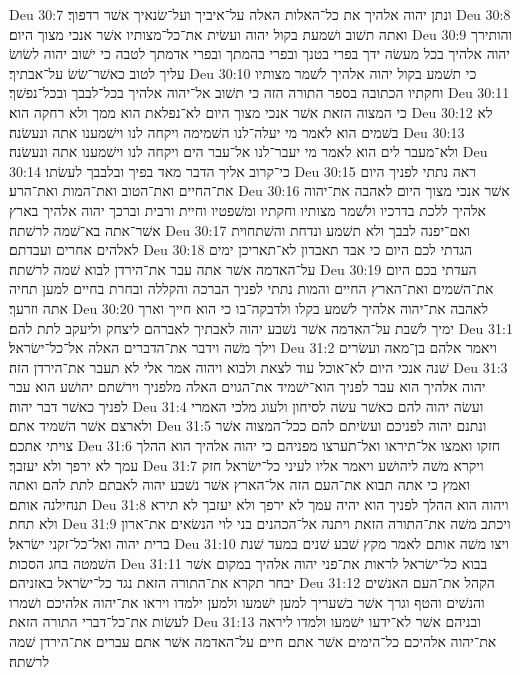 Deu 30:7  ונתן יהוה אלהיך את כל־האלות האלה על־איביך ועל־שׂנאיך אשׁר רדפוך׃
Deu 30:8  ואתה תשׁוב ושׁמעת בקול יהוה ועשׂית את־כל־מצותיו אשׁר אנכי מצוך היום׃
Deu 30:9  והותירך יהוה אלהיך בכל מעשׂה ידך בפרי בטנך ובפרי בהמתך ובפרי אדמתך לטבה כי ישׁוב יהוה לשׂושׂ עליך לטוב כאשׁר־שׂשׂ על־אבתיך׃
Deu 30:10  כי תשׁמע בקול יהוה אלהיך לשׁמר מצותיו וחקתיו הכתובה בספר התורה הזה כי תשׁוב אל־יהוה אלהיך בכל־לבבך ובכל־נפשׁך׃
Deu 30:11  כי המצוה הזאת אשׁר אנכי מצוך היום לא־נפלאת הוא ממך ולא רחקה הוא׃
Deu 30:12  לא בשׁמים הוא לאמר מי יעלה־לנו השׁמימה ויקחה לנו וישׁמענו אתה ונעשׂנה׃
Deu 30:13  ולא־מעבר לים הוא לאמר מי יעבר־לנו אל־עבר הים ויקחה לנו וישׁמענו אתה ונעשׂנה׃
Deu 30:14  כי־קרוב אליך הדבר מאד בפיך ובלבבך לעשׂתו׃
Deu 30:15  ראה נתתי לפניך היום את־החיים ואת־הטוב ואת־המות ואת־הרע׃
Deu 30:16  אשׁר אנכי מצוך היום לאהבה את־יהוה אלהיך ללכת בדרכיו ולשׁמר מצותיו וחקתיו ומשׁפטיו וחיית ורבית וברכך יהוה אלהיך בארץ אשׁר־אתה בא־שׁמה לרשׁתה׃
Deu 30:17  ואם־יפנה לבבך ולא תשׁמע ונדחת והשׁתחוית לאלהים אחרים ועבדתם׃
Deu 30:18  הגדתי לכם היום כי אבד תאבדון לא־תאריכן ימים על־האדמה אשׁר אתה עבר את־הירדן לבוא שׁמה לרשׁתה׃
Deu 30:19  העדתי בכם היום את־השׁמים ואת־הארץ החיים והמות נתתי לפניך הברכה והקללה ובחרת בחיים למען תחיה אתה וזרעך׃
Deu 30:20  לאהבה את־יהוה אלהיך לשׁמע בקלו ולדבקה־בו כי הוא חייך וארך ימיך לשׁבת על־האדמה אשׁר נשׁבע יהוה לאבתיך לאברהם ליצחק וליעקב לתת להם׃
Deu 31:1  וילך משׁה וידבר את־הדברים האלה אל־כל־ישׂראל׃
Deu 31:2  ויאמר אלהם בן־מאה ועשׂרים שׁנה אנכי היום לא־אוכל עוד לצאת ולבוא ויהוה אמר אלי לא תעבר את־הירדן הזה׃
Deu 31:3  יהוה אלהיך הוא עבר לפניך הוא־ישׁמיד את־הגוים האלה מלפניך וירשׁתם יהושׁע הוא עבר לפניך כאשׁר דבר יהוה׃
Deu 31:4  ועשׂה יהוה להם כאשׁר עשׂה לסיחון ולעוג מלכי האמרי ולארצם אשׁר השׁמיד אתם׃
Deu 31:5  ונתנם יהוה לפניכם ועשׂיתם להם ככל־המצוה אשׁר צויתי אתכם׃
Deu 31:6  חזקו ואמצו אל־תיראו ואל־תערצו מפניהם כי יהוה אלהיך הוא ההלך עמך לא ירפך ולא יעזבך׃
Deu 31:7  ויקרא משׁה ליהושׁע ויאמר אליו לעיני כל־ישׂראל חזק ואמץ כי אתה תבוא את־העם הזה אל־הארץ אשׁר נשׁבע יהוה לאבתם לתת להם ואתה תנחילנה אותם׃
Deu 31:8  ויהוה הוא ההלך לפניך הוא יהיה עמך לא ירפך ולא יעזבך לא תירא ולא תחת׃
Deu 31:9  ויכתב משׁה את־התורה הזאת ויתנה אל־הכהנים בני לוי הנשׂאים את־ארון ברית יהוה ואל־כל־זקני ישׂראל׃
Deu 31:10  ויצו משׁה אותם לאמר מקץ שׁבע שׁנים במעד שׁנת השׁמטה בחג הסכות׃
Deu 31:11  בבוא כל־ישׂראל לראות את־פני יהוה אלהיך במקום אשׁר יבחר תקרא את־התורה הזאת נגד כל־ישׂראל באזניהם׃
Deu 31:12  הקהל את־העם האנשׁים והנשׁים והטף וגרך אשׁר בשׁעריך למען ישׁמעו ולמען ילמדו ויראו את־יהוה אלהיכם ושׁמרו לעשׂות את־כל־דברי התורה הזאת׃
Deu 31:13  ובניהם אשׁר לא־ידעו ישׁמעו ולמדו ליראה את־יהוה אלהיכם כל־הימים אשׁר אתם חיים על־האדמה אשׁר אתם עברים את־הירדן שׁמה לרשׁתה׃
